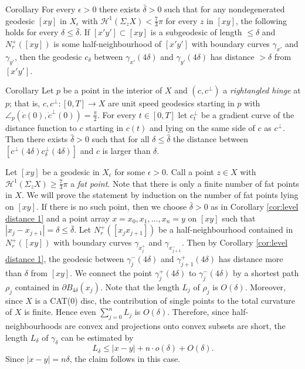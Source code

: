 \documentclass[a4paper,10pt]{amsart}
\begin{document}
\begin{thm}{Corollary}\label{cor:level distance 1}
For every $\epsilon>0$ there exists $\bar\delta>0$ such that for any nondegenerated geodesic $[xy]$ 
in $X_\epsilon$ with $\mathcal{H}^1(\Sigma_z X)< \frac{7}{3}\pi$
for every $z$ in $[xy]$, the following holds for every $\delta\leq\bar\delta$. 
If $[x'y']\subset[xy]$ is a subgeodesic of length $\leq\delta$ and $N^+_r([xy])$ is some half-neighbourhood 
of $[x'y']$ with boundary curves $\gamma_{x'}$ and $\gamma_{y'}$, 
then the geodesic $c_\delta$ between  $\gamma_{x'}(4\delta)$ and $\gamma_{y'}(4\delta)$ has distance $>\delta$
from $[x'y']$.
\end{thm}

\begin{thm}{Corollary}\label{cor:level distance 2}
Let $p$ be a point in the interior of $X$ and $(c,c^\perp)$ a {\em rightangled hinge} at $p$; that is, $c,c^\perp:[0,T]\to X$ are unit speed geodesics starting in $p$
with $\angle_p(\dot c(0),\dot c^\perp (0))=\frac{\pi}{2}$. For every $t\in[0,T]$ let
$c^\perp_t$ be a gradient curve of the distance function to $c$ starting in $c(t)$ and lying on the same side
of $c$ as $c^\perp$. Then there exists $\hat\delta>0$ such that for all $\delta\leq\hat\delta$ the distance between 
$[c^\perp(4\delta)c^\perp_\delta(4\delta)]$
and $c$ is larger than $\delta$.
\end{thm}








Let $[xy]$ be a geodesic in $X_\epsilon$ for some $\epsilon>0$. Call a point
$z\in X$ with $\mathcal{H}^1(\Sigma_z X)\geq \frac{7}{3}\pi$ a {\em fat point}. 
Note that there is only a finite number of 
fat points in $X$. We will prove the statement by induction on  the number 
of fat points lying on $[xy]$. If there is no such point, then we choose $\bar\delta>0$ 
as in Corollary \ref{cor:level distance 1} and a point array
$x=x_0,x_1,\ldots,x_n=y$ on $[xy]$ such that $|x_j-x_{j+1}|=\delta\leq\bar\delta$. Let $N_r^ +([x_j x_{j+1}])$ 
be a half-neighbourhood contained in $N_r^ +([x y])$
with boundary curves $\gamma_{x_j^ +}$ and $\gamma_{x_{j+1}^ -}$. Then by Corollary \ref{cor:level distance 1}, 
the geodesic between $\gamma_j^ -(4\delta)$
and $\gamma_{j+1}^ +(4\delta)$ has distance more than $\delta$ from $[xy]$. We connect the point 
$\gamma_j^ +(4\delta)$ to $\gamma_j^ -(4\delta)$ by a shortest path $\rho_j$
contained in $\partial B_{4\delta}(x_j)$. Note that the length $L_j$ of $\rho_j$ is $O(\delta)$. 
Moreover, since $X$
is a CAT(0) disc, the contribution of single points to the total curvature of $X$ is finite. Hence 
even $\sum_{j=0}^ n L_j$ is $O(\delta)$.
Therefore, since half-neighbourhoods are convex and projections onto convex subsets are short, the 
length $L_\delta$ of $\gamma_\delta$ can be
estimated by 
$$
L_\delta\leq |x-y|+n\cdot o(\delta)+O(\delta).
$$
Since $|x-y|=n\delta$, the claim follows in this case.
\end{document}
